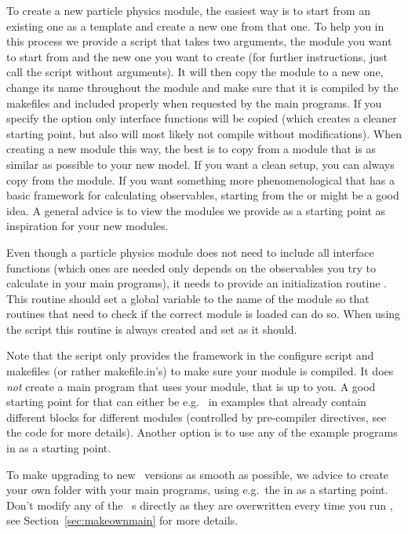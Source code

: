 To create a new particle physics module, the easiest way is to start from an existing one as a template 
and create a new one from that one. To help you in this process we provide a script 
 that takes two arguments, the module you want to start from and 
the new one you 
want to create (for further instructions, just call the script without arguments). 
It will then copy the module to a new one, change its name 
throughout the module and make sure that it is compiled by the makefiles and included properly when 
requested by the main programs. If you specify the option  only interface functions will be copied 
(which creates a cleaner starting point, but also will most likely not compile without modifications). When 
creating a new module this way, the best is to copy from a module that is as similar as possible to your 
new model. If you want a clean setup, you can always copy from the  module. If you want something more phenomenological that has a basic framework for calculating observables, starting from the  or  might be a good idea. A general
advice is to view the modules we provide as a starting point as inspiration for your new modules.

Even though a particle physics module does not need to include all interface functions (which ones 
are needed only depends on the observables you try to calculate in your main programs), it needs to provide 
an initialization routine 
. This routine should set a global variable  to the name of 
the module so that routines that need to check if the correct module is loaded can do so. When using the 
script  this routine is always created and  set as it should.


Note that the script  only provides the framework in the configure script and makefiles (or rather makefile.in's) to make sure your module is compiled. It does \emph{not} create a main program that uses your module, that is up to you. A good starting point for that can either be e.g.\  in examples that already contain different blocks for different modules (controlled by pre-compiler directives, see the code for more details). Another option is to use any of the example programs in  as a starting point. 

To make upgrading to new \ds\ versions as smooth as possible, we advice to create your own folder with your main programs, using e.g.\ the  in  as a starting point. Don't modify any of the \ds\ s directly as they are overwritten every time you run , see Section~\ref{sec:makeownmain} for more details.

